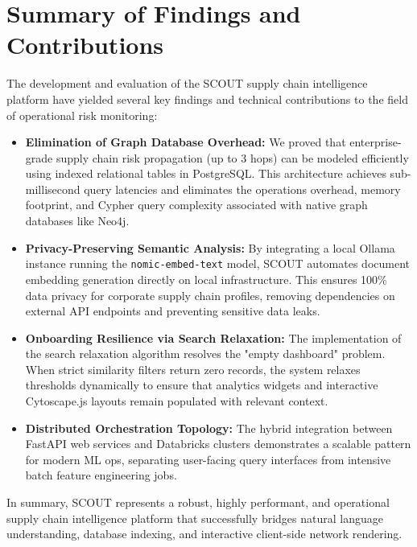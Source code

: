 \documentclass[12pt]{report}
\begin{document}
\section{Summary of Findings and Contributions}
The development and evaluation of the SCOUT supply chain intelligence platform have yielded several key findings and technical contributions to the field of operational risk monitoring:
\begin{itemize}
    \item \textbf{Elimination of Graph Database Overhead:} We proved that enterprise-grade supply chain risk propagation (up to 3 hops) can be modeled efficiently using indexed relational tables in PostgreSQL. This architecture achieves sub-millisecond query latencies and eliminates the operations overhead, memory footprint, and Cypher query complexity associated with native graph databases like Neo4j.
    \item \textbf{Privacy-Preserving Semantic Analysis:} By integrating a local Ollama instance running the \texttt{nomic-embed-text} model, SCOUT automates document embedding generation directly on local infrastructure. This ensures 100\% data privacy for corporate supply chain profiles, removing dependencies on external API endpoints and preventing sensitive data leaks.
    \item \textbf{Onboarding Resilience via Search Relaxation:} The implementation of the search relaxation algorithm resolves the "empty dashboard" problem. When strict similarity filters return zero records, the system relaxes thresholds dynamically to ensure that analytics widgets and interactive Cytoscape.js layouts remain populated with relevant context.
    \item \textbf{Distributed Orchestration Topology:} The hybrid integration between FastAPI web services and Databricks clusters demonstrates a scalable pattern for modern ML ops, separating user-facing query interfaces from intensive batch feature engineering jobs.
\end{itemize}
In summary, SCOUT represents a robust, highly performant, and operational supply chain intelligence platform that successfully bridges natural language understanding, database indexing, and interactive client-side network rendering.
\end{document}
